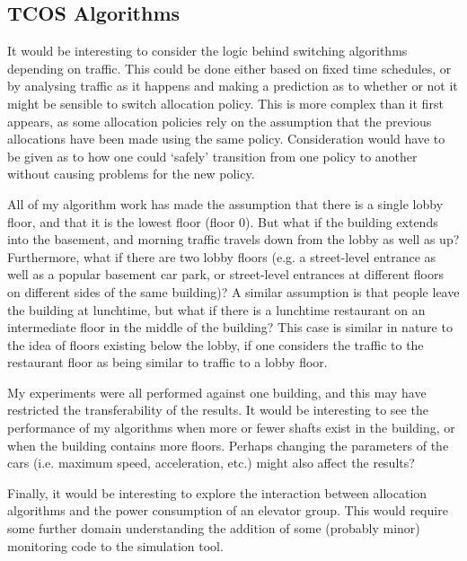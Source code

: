 \documentclass{UoYCSproject}
\begin{document}
\subsection{TCOS Algorithms}

It would be interesting to consider the logic behind switching algorithms depending on traffic.  This could be done either based on fixed time schedules, or by analysing traffic as it happens and making a prediction as to whether or not it might be sensible to switch allocation policy.  This is more complex than it first appears, as some allocation policies rely on the assumption that the previous allocations have been made using the same policy.  Consideration would have to be given as to how one could `safely' transition from one policy to another without causing problems for the new policy.

All of my algorithm work has made the assumption that there is a single lobby floor, and that it is the lowest floor (floor 0).  But what if the building extends into the basement, and morning traffic travels down from the lobby as well as up?  Furthermore, what if there are two lobby floors (e.g. a street-level entrance as well as a popular basement car park, or street-level entrances at different floors on different sides of the same building)?  A similar assumption is that people leave the building at lunchtime, but what if there is a lunchtime restaurant on an intermediate floor in the middle of the building?  This case is similar in nature to the idea of floors existing below the lobby, if one considers the traffic to the restaurant floor as being similar to traffic to a lobby floor.

My experiments were all performed against one building, and this may have restricted the transferability of the results.  It would be interesting to see the performance of my algorithms when more or fewer shafts exist in the building, or when the building contains more floors.  Perhaps changing the parameters of the cars (i.e. maximum speed, acceleration, etc.) might also affect the results?

Finally, it would be interesting to explore the interaction between allocation algorithms and the power consumption of an elevator group.  This would require some further domain understanding the addition  of some (probably minor) monitoring code to the simulation tool.


\end{document}
